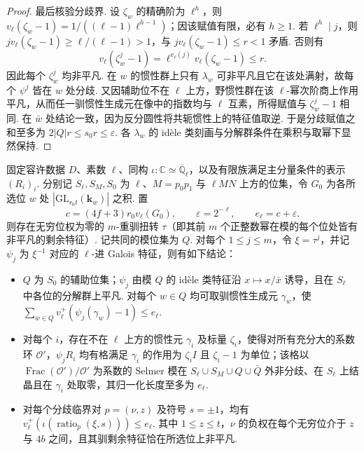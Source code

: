 \begin{proof}
最后核验分歧界. 设 $\zeta_w$ 的精确阶为 $\ell^h$，则
$v_\ell(\zeta_w-1)=1/((\ell-1)\ell^{h-1})$；因该赋值有限，必有 $h\ge1$. 若 $\ell^h\mid j$，则
$jv_\ell(\zeta_w-1)\ge\ell/(\ell-1)>1$，与 $jv_\ell(\zeta_w-1)\le r<1$ 矛盾. 否则有
\[
 v_\ell(\zeta_w^j-1)
  =\ell^{v_\ell(j)}v_\ell(\zeta_w-1)\le r .
\]
因此每个 $\zeta_w^j$ 均非平凡. 在 $w$ 的惯性群上只有 $\lambda_w$ 可非平凡且它在该处满射，故每个 $\psi^j$ 皆在 $w$ 处分歧. 又因辅助位不在 $\ell$ 上方，野惯性群在该 $\ell$-幂次阶商上作用平凡，从而任一驯惯性生成元在像中的指数均与 $\ell$ 互素，所得赋值与 $\zeta_w^j-1$ 相同. 在 $\bar w$ 处结论一致，因为反分圆性将共轭惯性上的特征值取逆. 于是分歧赋值之和至多为 $2|Q|r\le s_0r\le\varepsilon$. 各 $\lambda_w$ 的 idèle 类刻画与分解群条件在乘积与取幂下显然保持.
\end{proof}

\begin{lemma}
\label{lem:c-selmer-simultaneous-twist}
\emitthmsource
固定容许数据 $D$、素数 $\ell$、同构 $\iota\colon\mathbb C\simeq\overline{\mathbb Q}_\ell$，以及有限族满足主分量条件的表示 $(R_i)_i$. 分别记 $S_\ell,S_M,S_0$ 为 $\ell$、$M=p_0p_1$ 与 $\ell MN$ 上方的位集，令 $G_0$ 为各所选位 $w$ 处 $|\mathrm{GL}_{r_0t}(\mathbf k_w)|$ 之积. 置
\[
 c=(4f+3)r_0v_\ell(G_0),\qquad
 \varepsilon=2^{-\ell},\qquad e_\ell=c+\varepsilon.
\]
则存在无穷位权为零的 $m$-重驯扭转 $\tau$（即其前 $m$ 个正整数幂在模的每个位处皆有非平凡的剩余特征）. 记共同的模位集为 $Q$. 对每个 $1\le j\le m$，令 $\xi=\tau^j$，并记 $\psi_j$ 为 $\xi^{-1}$ 对应的 $\ell$-进 Galois 特征，则有如下结论：

\begin{itemize}
\item $Q$ 为 $S_0$ 的辅助位集；$\psi_j$ 由模 $Q$ 的 idèle 类特征沿 $x\mapsto x/\bar x$ 诱导，且在 $S_\ell$ 中各位的分解群上平凡. 对每个 $w\in Q$ 均可取驯惯性生成元 $\gamma_w$，使
$\sum_{w\in Q}v_\ell^+(\psi_j(\gamma_w)-1)\le e_\ell$.
\item 对每个 $i$，存在不在 $\ell$ 上方的惯性元 $\gamma_i$ 及标量 $\zeta_i$，使得对所有充分大的系数环 $\mathcal O'$，$\psi_jR_i$ 均有格满足 $\gamma_i$ 的作用为 $\zeta_i I$ 且 $\zeta_i-1$ 为单位；该格以 $\operatorname{Frac}(\mathcal O')/\mathcal O'$ 为系数的 Selmer 模在 $S_\ell\cup S_M\cup Q\cup\bar Q$ 外非分歧、在 $S_\ell$ 上结晶且在 $\gamma_i$ 处取零，其归一化长度至多为 $e_\ell$.
\item 对每个分歧临界对 $p=(\nu,z)$ 及符号 $s=\pm1$，均有
$v_\ell^+(\iota(\operatorname{ratio}_p(\xi,s)))\le e_\ell$.
其中 $1\le z\le t$，$\nu$ 的负权在每个无穷位介于 $z$ 与 $4b$ 之间，且其驯剩余特征恰在所选位上非平凡.
\end{itemize}
\end{lemma}


